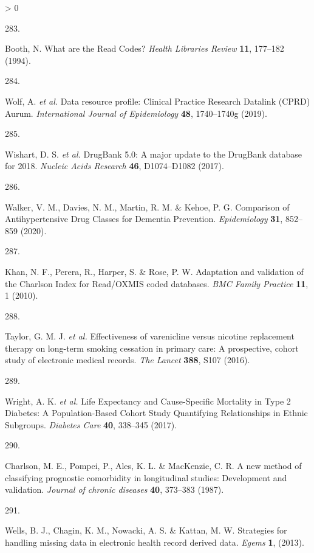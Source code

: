 \documentclass[a4paper, twoside]{templates/ociamthesis}
\newlength{\cslhangindent}
\newlength{\csllabelwidth}
\newenvironment{CSLReferences}[3] %
 {%
  \setlength{\parindent}{0pt}
  \ifodd #1 \everypar{\setlength{\hangindent}{\cslhangindent}}\ignorespaces\fi
  \ifnum #2 > 0
  \setlength{\parskip}{#2\baselineskip}
  \fi
 }%
 {}
\newcommand{\CSLLeftMargin}[1]{\parbox[t]{\maxof{\widthof{#1}}{\csllabelwidth}}{#1}}
\newcommand{\CSLRightInline}[1]{\parbox[t]{\linewidth - \csllabelwidth}{#1}}
\begin{document}
\begin{CSLReferences}{0}{0}
\leavevmode\hypertarget{ref-booth1994}{}%
\CSLLeftMargin{283. }
\CSLRightInline{Booth, N. What are the {Read Codes}? \emph{Health Libraries Review} \textbf{11}, 177--182 (1994).}

\leavevmode\hypertarget{ref-wolf2019}{}%
\CSLLeftMargin{284. }
\CSLRightInline{Wolf, A. \emph{et al.} Data resource profile: Clinical {Practice Research Datalink} ({CPRD}) {Aurum}. \emph{International Journal of Epidemiology} \textbf{48}, 1740--1740g (2019).}

\leavevmode\hypertarget{ref-wishart2017}{}%
\CSLLeftMargin{285. }
\CSLRightInline{Wishart, D. S. \emph{et al.} {DrugBank} 5.0: A major update to the {DrugBank} database for 2018. \emph{Nucleic Acids Research} \textbf{46}, D1074--D1082 (2017).}

\leavevmode\hypertarget{ref-walker2020}{}%
\CSLLeftMargin{286. }
\CSLRightInline{Walker, V. M., Davies, N. M., Martin, R. M. \& Kehoe, P. G. Comparison of {Antihypertensive Drug Classes} for {Dementia Prevention}. \emph{Epidemiology} \textbf{31}, 852--859 (2020).}

\leavevmode\hypertarget{ref-khan2010}{}%
\CSLLeftMargin{287. }
\CSLRightInline{Khan, N. F., Perera, R., Harper, S. \& Rose, P. W. Adaptation and validation of the {Charlson Index} for {Read}/{OXMIS} coded databases. \emph{BMC Family Practice} \textbf{11}, 1 (2010).}

\leavevmode\hypertarget{ref-taylor2016}{}%
\CSLLeftMargin{288. }
\CSLRightInline{Taylor, G. M. J. \emph{et al.} Effectiveness of varenicline versus nicotine replacement therapy on long-term smoking cessation in primary care: A prospective, cohort study of electronic medical records. \emph{The Lancet} \textbf{388}, S107 (2016).}

\leavevmode\hypertarget{ref-wright2017}{}%
\CSLLeftMargin{289. }
\CSLRightInline{Wright, A. K. \emph{et al.} Life {Expectancy} and {Cause}-{Specific Mortality} in {Type} 2 {Diabetes}: A {Population}-{Based Cohort Study Quantifying Relationships} in {Ethnic Subgroups}. \emph{Diabetes Care} \textbf{40}, 338--345 (2017).}

\leavevmode\hypertarget{ref-charlson1987new}{}%
\CSLLeftMargin{290. }
\CSLRightInline{Charlson, M. E., Pompei, P., Ales, K. L. \& MacKenzie, C. R. A new method of classifying prognostic comorbidity in longitudinal studies: Development and validation. \emph{Journal of chronic diseases} \textbf{40}, 373--383 (1987).}

\leavevmode\hypertarget{ref-wells2013strategies}{}%
\CSLLeftMargin{291. }
\CSLRightInline{Wells, B. J., Chagin, K. M., Nowacki, A. S. \& Kattan, M. W. Strategies for handling missing data in electronic health record derived data. \emph{Egems} \textbf{1}, (2013).}


\end{CSLReferences}
\end{document}
